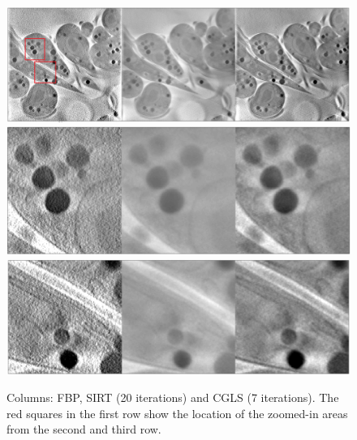 \begin{figure}
\begin{center}

\includegraphics[width=\textwidth]{Applications/FBP_SIRT_CGLSm.png} 
\includegraphics[width=\textwidth]{Applications/FBP_SIRT_CGLSz1.png} 
\includegraphics[width=\textwidth]{Applications/FBP_SIRT_CGLSz2.png} 

\end{center}

\caption[Cell image recosntructed with different algorithms 1-1]{\label{fig:CGLSSIRT} Columns: FBP, SIRT (20 iterations) and CGLS (7 iterations). The red squares in the first row show the location of the zoomed-in areas from the second and third row.} 
\end{figure}


